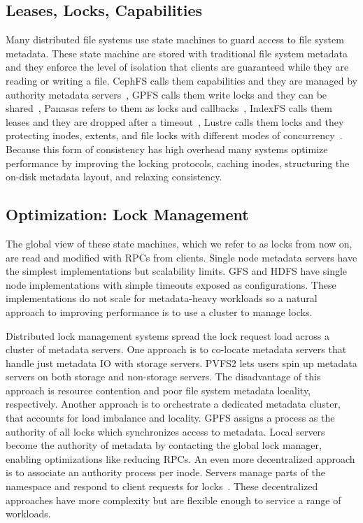 \subsection{Leases, Locks, Capabilities}

Many distributed file systems use state machines to guard access to file system
metadata.  These state machine are stored with traditional file system metadata
and they enforce the level of isolation that clients are guaranteed while they
are reading or writing a file. CephFS calls them capabilities and they are
managed by authority metadata servers~\cite{}, GPFS calls them write locks and
they can be shared~\cite{}, Panasas refers to them as locks and
callbacks~\cite{}, IndexFS calls them leases and they are dropped after a
timeout~\cite{}, Lustre calls them locks and they protecting inodes, extents,
and file locks with different modes of concurrency~\cite{wang:tech09-lustre}.
Because this form of consistency has high overhead many systems optimize
performance by improving the locking protocols, caching inodes, structuring the
on-disk metadata layout, and relaxing consistency.

\subsection{Optimization: Lock Management}

The global view of these state machines, which we refer to as locks from now
on, are read and modified with RPCs from clients.  Single node metadata
servers have the simplest implementations but scalability limits. GFS and HDFS
have single node implementations with simple timeouts exposed as
configurations. These implementations do not scale for metadata-heavy workloads
so a natural approach to improving performance is to use a cluster to manage
locks.

Distributed lock management systems spread the lock request load across a
cluster of metadata servers. One approach is to co-locate metadata servers that
handle just metadata IO with storage servers. PVFS2 lets users spin up metadata
servers on both storage and non-storage servers. The disadvantage of this
approach is resource contention and poor file system metadata locality,
respectively. Another approach is to orchestrate a dedicated metadata cluster,
that accounts for load imbalance and locality. GPFS assigns a process as the
authority of all locks which synchronizes access to metadata. Local servers
become the authority of metadata by contacting the global lock manager,
enabling optimizations like reducing RPCs. An even more decentralized approach
is to associate an authority process per inode. Servers manage parts of the
namespace and respond to client requests for locks~\cite{wang:tech09-lustre,
ren:sc2014-indexfs, weil:sc2004-dyn-metadata, welch:fast08-panasas}.  These
decentralized approaches have more complexity but are flexible enough to
service a range of workloads.

